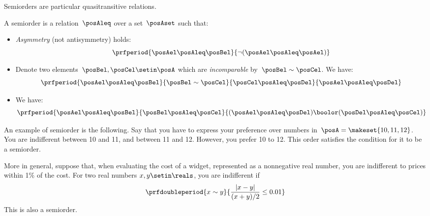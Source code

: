 Semiorders are particular quasitransitive relations.
\begin{definition}[Semiorder]\label{def:semiorder}
    A semiorder is a relation~$\posAleq$ over a set~$\posAset$ such that:
    \begin{itemize}
        \item \emph{Asymmetry} (not antisymmetry) holds:
              \begin{equation}\label{eq:semiorder-asym}
                  \prfperiod{
                      \posAel \posAleq \posBel
                  }{
                      \neg(\posAel \posAleq \posAel)
                  }
              \end{equation}
        \item Denote two elements~$\posBel, \posCel \setin \posA$ which are \emph{incomparable} by~$\posBel \sim \posCel$.
              We have:
              \begin{equation}\label{eq:el-incomparable}
                  \prfperiod{
                      \posAel \posAleq \posBel
                  }{
                      \posBel \sim \posCel
                  }{
                      \posCel \posAleq \posDel
                  }{
                      \posAel \posAleq \posDel
                  }
              \end{equation}
        \item We have:
              \begin{equation}\label{eq:semiorder-2}
                  \prfperiod{
                      \posAel \posAleq \posBel
                  }{
                      \posBel \posAleq \posCel
                  }{
                      (\posAel \posAleq \posDel) \boolor (\posDel \posAleq \posCel)
                  }
              \end{equation}
    \end{itemize}

\end{definition}
\begin{example}
    An example of semiorder is the following.
    Say that you have to express your preference over numbers in~$\posA=\makeset{10,11,12}$.
    You are indifferent between 10 and 11, and between 11 and 12.
    However, you prefer 10 to 12.
    This order satisfies the condition for it to be a semiorder.

    More in general, suppose that, when evaluating the cost of a widget, represented as a nonnegative real number, you are indifferent to prices within 1\% of the cost.
    For two real numbers $x,y\setin\reals$, you are indifferent if
    \begin{equation}\label{eq:semiorder-tolerances}
        \prfdoubleperiod{
            x \sim y
        }{
            \frac{| x - y |}{ (x+y)/2} \leq 0.01
        }
    \end{equation}
    This is also a semiorder.
\end{example}

